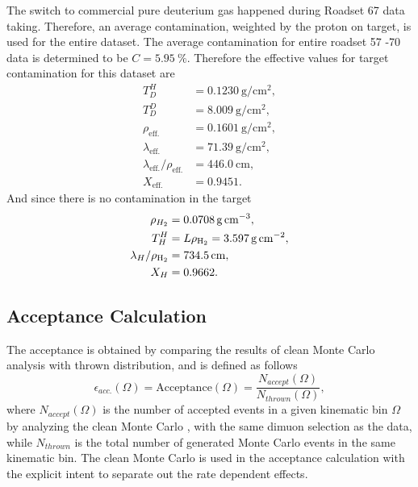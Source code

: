 \documentclass[../main.tex]{subfiles}
\begin{document}
The switch to commercial pure deuterium gas happened during Roadset 67 data taking. Therefore,
an average contamination, weighted by the proton on target, is used for the entire dataset.
The average contamination for entire roadset 57 -70 data is determined to be $C=\SI{5.95}{\percent}$.
Therefore the effective values for target contamination for this dataset are
\begin{equation}
	\begin{split}
		T_D^H &= \SI{0.1230}{\g\per\cm\squared}, \\
		T_D^D &= \SI{8.009}{\g\per\cm\squared},\\
		\rho_{\mathrm{eff.}} & = \SI{0.1601}{\g\per\cm\squared},\\
		\lambda_{\mathrm{eff.}} &= \SI{71.39}{\g\per\cm\squared},\\
		\lambda_{\mathrm{eff.}}/\rho_{\mathrm{eff.}} &= \SI{446.0}{\cm},\\
		X_{\mathrm{eff.}} &= 0.9451.
	\end{split}
\end{equation}
And since there is no contamination in the  target
\begin{equation}
	\begin{split}
		\rho_{H_2} &= \SI{0.0708}{\g\per\cm\cubed},\\
		T_H^H &= L\rho_{\ce{H_2}} = \SI{3.597}{\g\per\cm\squared},\\
		\lambda_H/\rho_{\ce{H_2}} &= \SI{734.5}{\cm},\\
		X_H &=0.9662.
	\end{split}
\end{equation}


\subsection{Acceptance Calculation}
The acceptance is obtained by comparing the results of clean Monte Carlo analysis with thrown distribution,
and is defined as follows
\begin{equation}
	\epsilon_{acc.}\left(\Omega\right)=\mathrm{Acceptance}\left(\Omega\right)= \frac{N_{accept}\left(\Omega\right)}{N_{thrown}\left(\Omega\right)},
\end{equation}
where $N_{accept}\left(\Omega\right)$ is the number of accepted events in a given kinematic bin $\Omega$
by analyzing the clean Monte Carlo , with the same dimuon selection
as the data, while $N_{thrown}$ is the total number of generated Monte Carlo events in the same kinematic bin.
The clean Monte Carlo is used in the acceptance calculation with the explicit intent to separate out the
rate dependent effects.
\end{document}
